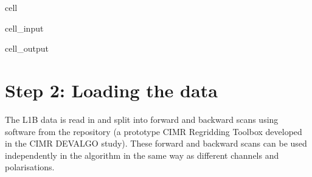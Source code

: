 \documentclass[letterpaper,10pt,english]{jupyterBook}
\begin{document}
\begin{sphinxuseclass}{cell}
\begin{sphinxVerbatimInput}
\begin{sphinxuseclass}{cell_input}
\begin{sphinxVerbatim}[commandchars=\\\{\}]
  
\PYG{p}{[}  \PYG{p}{]}  

  
\PYG{p}{[}  \PYG{p}{]}  
\end{sphinxVerbatim}

\end{sphinxuseclass}\end{sphinxVerbatimInput}
\begin{sphinxVerbatimOutput}

\begin{sphinxuseclass}{cell_output}
\noindent{}

\end{sphinxuseclass}\end{sphinxVerbatimOutput}

\end{sphinxuseclass}

\section{Step 2: Loading the data}
\label{\detokenize{CIMR_L2_Sea_Ice_Drift_preproc:step-2-loading-the-data}}
\sphinxAtStartPar
The L1B data is read in and split into forward and backward scans using software from the  repository (a prototype CIMR Regridding Toolbox developed in the CIMR DEVALGO study). These forward and backward scans can be used independently in the algorithm in the same way as different channels and polarisations.
\end{document}
